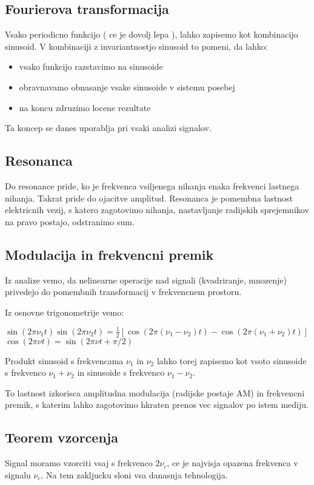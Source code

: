 \documentclass{article}
\begin{document}
\begin{multicols}{3}
\subsection{Fourierova transformacija}
Vsako periodicno funkcijo ( ce je dovolj lepa ), lahko zapisemo kot kombinacijo sinusoid.
V kombinaciji z invariantnostjo sinusoid to pomeni, da lahko:
\begin{itemize}
    \item vsako funkcijo razstavimo na sinusoide
    \item obravnavamo obnasanje vsake sinusoide v sistemu posebej
    \item na koncu zdruzimo locene rezultate
\end{itemize}
Ta koncep se danes uporablja pri vsaki analizi signalov.

\subsection{Resonanca}
Do resonance pride, ko je frekvenca vsiljenega nihanja enaka frekvenci lastnega nihanja. Takrat pride do ojacitve amplitud.
Resonanca je pomembna lastnost elektricnih vezij, s katero zagotovimo nihanja, nastavljanje radijskih sprejemnikov na pravo postajo,
odstranimo sum.

\subsection{Modulacija in frekvencni premik}
Iz analize vemo, da nelinearne operacije nad signali (kvadriranje, mnozenje) privedejo do 
pomembnih transformacij v frekvencnem prostoru.

Iz osnovne trigonometrije vemo:
\begin{center}
    \begin{math}
        \sin(2 \pi \nu_1 t) \sin(2 \pi \nu_2 t) = \frac{1}{2} [\cos(2 \pi(\nu_1 - \nu_2)t) - \cos(2 \pi (\nu_1 + \nu_2)t)]
    \end{math}\\
    \begin{math}
        \cos(2 \pi \nu t) = \sin(2 \pi \nu t + \pi / 2)
    \end{math}
\end{center}
Produkt sinusoid s frekvencama $\nu_1$ in $\nu_2$ lahko torej zapisemo kot vsoto sinusoide s frekvenco $\nu_1 + \nu_2$ in 
sinusoide s frekvenco $\nu_1 - \nu_2$.

To lastnost izkorisca amplitudna modulacija (radijske postaje AM) in frekvencni premik, s katerim lahko zagotovimo
hkraten prenos vec signalov po istem mediju.

\subsection{Teorem vzorcenja}
Signal moramo vzorciti vsaj s frekvenco $2 \nu_c$, ce je najvisja opazena frekvenca v signalu $\nu_c$. Na tem zakljucku
sloni vsa danasnja tehnologija.

\end{multicols}
\end{document}

